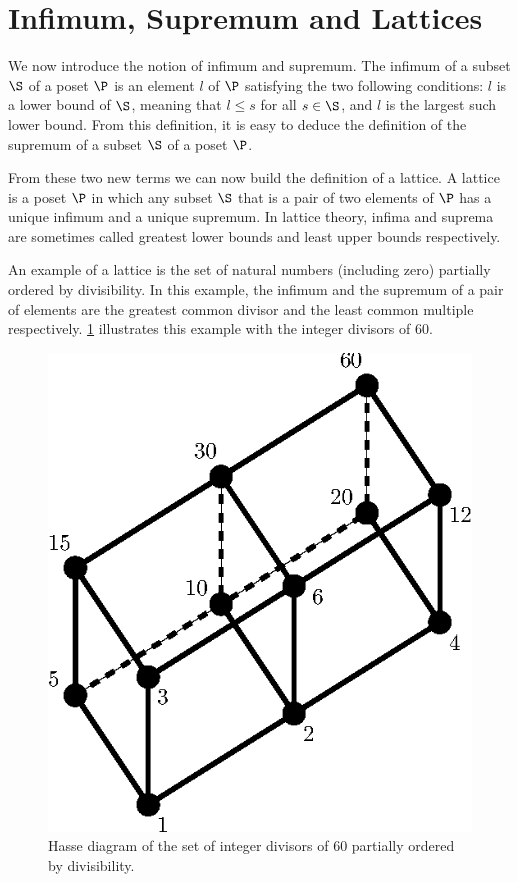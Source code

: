 \section{Infimum, Supremum and Lattices}
\label{tree:poset:lattices}

We now introduce the notion of infimum and supremum. The infimum of a
subset \(\S\) of a poset \(\P\) is an element \(l\) of \(\P\) satisfying the two
following conditions: \(l\) is a lower bound of \(\S\), meaning that \(l \le
s\) for all \(s \in \S\), and \(l\) is the largest such lower bound. From this
definition, it is easy to deduce the definition of the supremum of a subset
\(\S\) of a poset \(\P\).

From these two new terms we can now build the definition of a lattice. A
lattice is a poset \(\P\) in which any subset \(\S\) that is a pair of two
elements of \(\P\) has a unique infimum and a unique supremum. In lattice
theory, infima and suprema are sometimes called greatest lower bounds and least
upper bounds respectively.

An example of a lattice is the set of natural numbers (including zero)
partially ordered by divisibility. In this example, the infimum and the
supremum of a pair of elements are the greatest common divisor and the least
common multiple respectively. \ref{fig:poset:lattice:60div} illustrates this
example with the integer divisors of \(60\).

\begin{figure}
\center
\includegraphics[height=0.2\textheight]{fig/poset/lattice/60div}
\caption{Hasse diagram of the set of integer divisors of \(60\) partially ordered by
divisibility.}\label{fig:poset:lattice:60div}
\end{figure}
